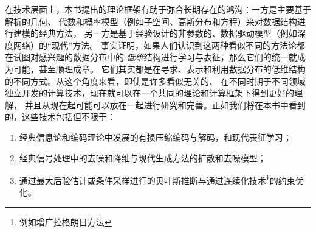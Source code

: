 \documentclass[../../book-main_zh.tex]{subfiles}
\begin{document}
在技术层面上，本书提出的理论框架有助于弥合长期存在的鸿沟：一方是主要基于解析的几何、
代数和概率模型（例如子空间、高斯分布和方程）来对数据结构进行建模的经典方法，
另一方是基于经验设计的非参数的、数据驱动模型（例如深度网络）的“现代”方法。
事实证明，如果人们认识到这两种看似不同的方法论都在试图对感兴趣的数据分布中的
{\em 低维}结构进行学习与表征，那么它们的统一就成为可能，甚至顺理成章。
它们其实都是在寻求、表示和利用数据分布的低维结构的不同方式。从这个角度来看，即使是许多看似无关的、
在不同时期于不同领域独立开发的计算技术，现在就可以在一个共同的理论和计算框架下得到更好的理解，
并且从现在起可能可以放在一起进行研究和完善。正如我们将在本书中看到的，这些技术包括但不限于：
\begin{enumerate}
    \item 经典信息论和编码理论中发展的有损压缩编码与解码，和现代表征学习；
    \item 经典信号处理中的去噪和降维与现代生成方法的扩散和去噪模型；
    \item 通过最大后验估计或条件采样进行的贝叶斯推断与通过连续化技术\footnote{例如增广拉格朗日方法}的约束优化。
\end{enumerate}
\end{document}
